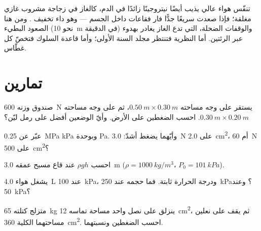 \begin{remark}\label{rem:g10:pressure:deco}
تنفّس هواء عالي  يذيب أيضًا نيتروجينًا زائدًا في الدم،
كالغاز في زجاجة مشروب غازي مغلقة؛ فإذا صعدت سريعًا جدًّا فار
فقاعات داخل الجسم --- وهو داء تخفيف . ومن هنا
الصعود البطيء (نحو \qty{10}{m} في الدقيقة) والوقفات الضحلة، التي تدع
الغاز يغادر بهدوء عبر الرئتين. أما النظرية فتنتظر مجلد السنة
الأولى؛ وأما قاعدة السلوك فتخصّ كل غطّاس.
\end{remark}

\section{تمارين}

\begin{exercise}[$\star$]\label{exo:g10:pressure:1}
صندوق وزنه \qty{600}{N} يستقر على وجه مساحته
$\qty{0.50}{m} \times \qty{0.30}{m}$، ثم على وجه مساحته
$\qty{0.30}{m} \times \qty{0.20}{m}$. احسب الضغطين على
الأرض. وأيّ الوضعين أفضل على رمل ليّن؟
\end{exercise}

\begin{exercise}[$\star$]\label{exo:g10:pressure:2}
عبّر عن \qty{0.25}{MPa}  \unit{kPa} وبوحدة \unit{Pa}. وأيّهما يضغط
أشدّ: \qty{3.0}{N} على \qty{2.0}{cm^2}، أم \qty{60}{N} على
\qty{500}{cm^2}؟
\end{exercise}

\begin{exercise}[$\star$]\label{exo:g10:pressure:3}
احسب  $\rho g h$  عند
قاع مسبح عمقه \qty{3.0}{m}
($\rho = \qty{1000}{kg/m^3}$، $P_0 = \qty{101}{kPa}$).
\end{exercise}

\begin{exercise}[$\star$]\label{exo:g10:pressure:4}
يشغل هواء \qty{4.0}{L} عند \qty{100}{kPa}، ودرجة الحرارة ثابتة.
فما حجمه عند \qty{250}{kPa}؟ وعند \qty{50}{kPa}؟
\end{exercise}

\begin{exercise}[$\star$]\label{exo:g10:pressure:5}
متزلج كتلته \qty{65}{kg} ينزلق على نصل واحد مساحة تماسه
\qty{12}{cm^2}، ثم يقف على نعلين مساحتهما الكلية \qty{360}{cm^2}.
احسب الضغطين ونسبتهما.
\end{exercise}

